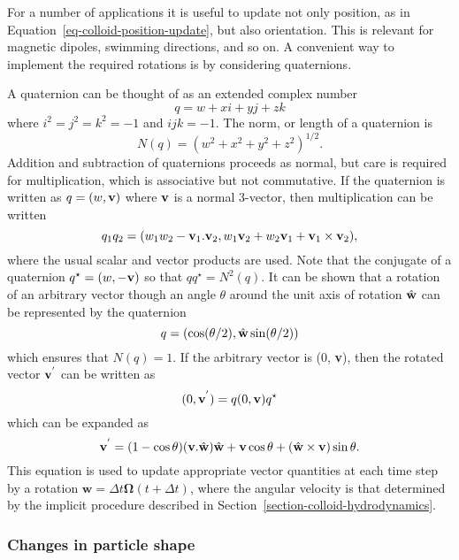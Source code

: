 For a number of applications it is useful to update not only
position, as in Equation~\ref{eq-colloid-position-update},
but also orientation. This is relevant for magnetic
dipoles, swimming directions,  and so on. A convenient way to
implement the required rotations is by considering quaternions.

A quaternion can be thought of as an extended complex number
\begin{equation}
q = w + xi + yj + zk
\end{equation}
where $i^2 = j^2 = k^2 = -1$ and $ijk = -1$. The norm, or length
of a quaternion is
\begin{equation}
N(q) = (w^2 + x^2 + y^2 + z^2)^{1/2}.
\end{equation}
Addition and subtraction of quaternions proceeds as normal, but
care is required for multiplication, which is associative but not
commutative. If the quaternion is written as $q = (w, {\bf v})$ where
$\bf{v}$ is a normal 3-vector, then multiplication can be written
\begin{equation}
q_1 q_2 = (w_1 w_2 - {\bf v}_1 . {\bf v}_2, w_1 {\bf v}_2 + w_2 {\bf v}_1
+ {\bf v}_1 \times {\bf v}_2),
\end{equation}
where the usual scalar and vector products are used. Note that the
conjugate of a quaternion $q^\star = (w, -{\bf v})$ so that
$qq^\star = N^2(q)$.
It can be shown that a rotation of an arbitrary vector though an
angle $\theta$ around the unit axis of rotation $\hat{\bf w}$ can
be represented by the quaternion
\begin{equation}
q = (\cos(\theta/2), \hat{\bf w} \sin(\theta/2))
\end{equation}
which ensures that $N(q) = 1$. If the arbitrary vector is (0, {\bf v}),
then the rotated vector ${\bf v}^{'}$ can be written as
\begin{equation}
(0, {\bf v}^{'}) = q (0, {\bf v}) q^\star
\end{equation}
which can be expanded as
\begin{equation}
{\bf v}^{'} = (1 - \cos\theta)({\bf v}.{\hat{\bf w}) \hat{\bf w} +
{\bf v}\cos\theta} + (\hat{\bf w} \times {\bf v})\sin\theta.  
\end{equation}
This equation is used to update appropriate vector quantities at
each time step by a rotation
$\mathbf{w} = \Delta t \mathbf{\Omega}(t +\Delta t)$,
where the angular velocity is that determined by the implicit
procedure described in Section~\ref{section-colloid-hydrodynamics}.

\subsubsection{Changes in particle shape}

